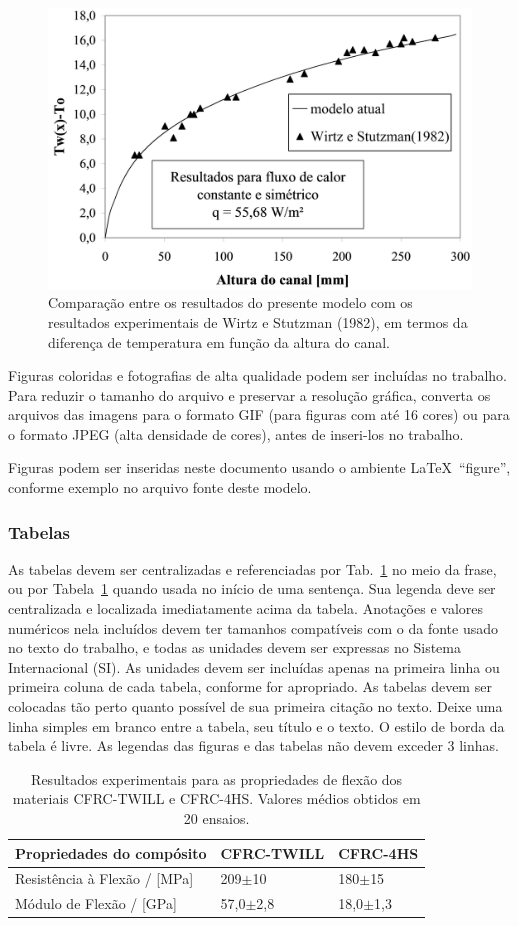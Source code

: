 \documentclass[%
  report,%
  10pt,%
  a4paper,%
  fleqn,%
  oneside,%
  sumario = tradicional,%
  chapter = TITLE,%
  section = TITLE,%
]{abntex2}
\begin{document}
\begin{figure}[!htb]
\centering
\caption{Comparação entre os resultados do presente modelo com os resultados experimentais de Wirtz e Stutzman (1982), em termos da diferença de temperatura em função da altura do canal.}
\label{fig:grafico}
\includegraphics[width = 0.5\columnwidth]{./Figuras/grafico}
\end{figure}

Figuras coloridas e fotografias de alta qualidade podem ser incluídas no trabalho. Para reduzir o tamanho do arquivo e preservar a resolução gráfica, converta os arquivos das imagens para o formato GIF (para figuras com até 16 cores) ou para o formato JPEG (alta densidade de cores), antes de inseri-los no trabalho.

Figuras podem ser inseridas neste documento usando o ambiente \LaTeX\ ``figure'', conforme exemplo no arquivo fonte deste modelo.

\subsubsection{Tabelas}\label{sssec:tabs}

As tabelas devem ser centralizadas e referenciadas por Tab.~\ref{tab:resexp} no meio da frase, ou por Tabela~\ref{tab:resexp} quando usada no início de uma sentença. Sua legenda deve ser centralizada e localizada imediatamente acima da tabela. Anotações e valores numéricos nela incluídos devem ter tamanhos compatíveis com o da fonte usado no texto do trabalho, e todas as unidades devem ser expressas no Sistema Internacional (SI). As unidades devem ser incluídas apenas na primeira linha ou primeira coluna de cada tabela, conforme for apropriado. As tabelas devem ser colocadas tão perto quanto possível de sua primeira citação no texto. Deixe uma linha simples em branco entre a tabela, seu título e o texto. O estilo de borda da tabela é livre. As legendas das figuras e das tabelas não devem exceder 3 linhas.

\begin{table}[!htb]
\centering
\caption{Resultados experimentais para as propriedades de flexão dos materiais CFRC-TWILL e CFRC-4HS. Valores médios obtidos em 20 ensaios.}
\label{tab:resexp}
\begin{tabular*}{\textwidth}{@{\extracolsep{\fill}}lll}
\hline
Propriedades do compósito    & CFRC-TWILL    & CFRC-4HS     \\ \hline
Resistência à Flexão / [MPa] & 209$\pm$10    & 180$\pm$15   \\
Módulo de Flexão / [GPa]     & 57,0$\pm$2,8  & 18,0$\pm$1,3 \\ \hline
\end{tabular*}
\end{table}
\end{document}

